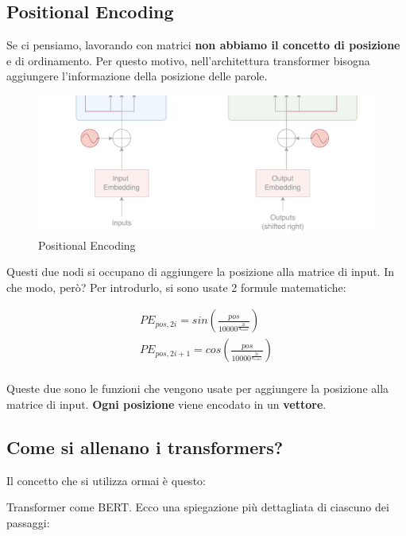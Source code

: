 \subsection{Positional Encoding}

Se ci pensiamo, lavorando con matrici \textbf{non abbiamo il concetto di
    posizione} e di ordinamento. Per questo motivo, nell'architettura transformer
bisogna aggiungere l'informazione della posizione delle parole.

\begin{figure}[H]
    \includegraphics[width=\textwidth]{images/penc.png}
    \caption{Positional Encoding}
\end{figure}

Questi due nodi si occupano di aggiungere la posizione alla matrice di input.
In che modo, però? Per introdurlo, si sono usate 2 formule matematiche:

\begin{equation}
    \begin{aligned}
        PE_{pos, 2i} = sin \left( \frac{pos}{10000^{\frac{2i}{d_{model}}}} \right)   \\
        PE_{pos, 2i+1} = cos \left( \frac{pos}{10000^{\frac{2i}{d_{model}}}} \right) \\
    \end{aligned}
\end{equation}

Queste due sono le funzioni che vengono usate per aggiungere la posizione alla
matrice di input. \textbf{Ogni posizione} viene encodato in un
\textbf{vettore}.

\subsection{Come si allenano i transformers?}
Il concetto che si utilizza ormai è questo:

Transformer come BERT. Ecco una spiegazione più dettagliata di ciascuno dei
passaggi:

